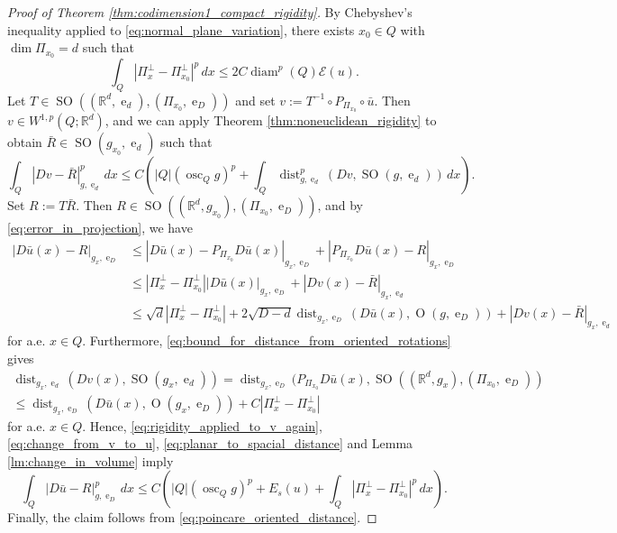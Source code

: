 \documentclass[10pt,a4paper]{amsart}
\DeclareMathOperator{\Ort}{O}
\DeclareMathOperator{\SO}{SO}
\DeclareMathOperator{\diam}{diam}
\DeclareMathOperator{\dist}{dist}
\DeclareMathOperator{\e}{e}
\DeclareMathOperator*{\osc}{osc}
\begin{document}
\begin{proof}[Proof of Theorem \ref{thm:codimension1_compact_rigidity}]
    By Chebyshev's inequality applied to \eqref{eq:normal_plane_variation}, there exists $x_0 \in Q$ with $\dim \Pi_{x_0} = d$ such that
    \begin{equation} \label{eq:poincare_oriented_distance}
        \int_Q |\Pi_x^\perp - \Pi_{x_0}^\perp|^p \, dx \le 2C \diam^p(Q) \mathcal{E}(u).
    \end{equation}
    Let $T \in \SO((\mathbb{R}^d, \e_d), (\Pi_{x_0}, \e_D))$ and set $v := T^{-1} \circ P_{\Pi_{x_0}} \circ \bar{u}$. Then $v \in W^{1, p}(Q; \mathbb{R}^d)$, and we can apply Theorem \ref{thm:noneuclidean_rigidity} to obtain $\bar{R} \in \SO(g_{x_0}, \e_d)$ such that
    \begin{equation} \label{eq:rigidity_applied_to_v_again}
        \int_Q |Dv - \bar{R}|_{g, \e_d}^p \, dx \le C \left(|Q| \left(\osc_Q g\right)^p + \int_Q \dist_{g, \e_d}^p(Dv, \SO(g, \e_d)) \, dx\right).
    \end{equation}
    Set $R := T\bar{R}$. Then $R \in \SO((\mathbb{R}^d, g_{x_0}), (\Pi_{x_0}, \e_D))$, and by \eqref{eq:error_in_projection}, we have
    \begin{equation} \label{eq:change_from_v_to_u}
        \begin{aligned}
            |D\bar{u}(x) - R|_{g_x, \e_D} &\le |D\bar{u}(x) - P_{\Pi_{x_0}} D\bar{u}(x)|_{g_x, \e_D} + |P_{\Pi_{x_0}} D\bar{u}(x) - R|_{g_x, \e_D} \\
            &\le |\Pi_x^\perp - \Pi_{x_0}^\perp| |D\bar{u}(x)|_{g_x, \e_D} + |Dv(x) - \bar{R}|_{g_x, \e_d} \\
            &\le \sqrt{d} |\Pi_x^\perp - \Pi_{x_0}^\perp| + 2\sqrt{D - d} \dist_{g_x, \e_D}(D\bar{u}(x), \Ort(g, \e_D)) + |Dv(x) - \bar{R}|_{g_x, \e_d}
        \end{aligned}
    \end{equation}
    for a.e. $x \in Q$. Furthermore, \eqref{eq:bound_for_distance_from_oriented_rotations} gives
    \begin{multline} \label{eq:planar_to_spacial_distance}
        \dist_{g_x, \e_d}(Dv(x), \SO(g_x, \e_d)) = \dist_{g_x, \e_D}(P_{\Pi_{x_0}} D\bar{u}(x), \SO((\mathbb{R}^d, g_x), (\Pi_{x_0}, \e_D)) \\
        \le \dist_{g_x, \e_D}(D\bar{u}(x), \Ort(g_x, \e_D)) + C|\Pi_x^\perp - \Pi_{x_0}^\perp|
    \end{multline}
    for a.e. $x \in Q$. Hence, \eqref{eq:rigidity_applied_to_v_again}, \eqref{eq:change_from_v_to_u}, \eqref{eq:planar_to_spacial_distance} and Lemma \ref{lm:change_in_volume} imply
    \[
    \int_Q |D\bar{u} - R|_{g, \e_D}^p \, dx \le C \left(|Q| \left(\osc_Q g\right)^p + E_s(u) + \int_Q |\Pi_x^\perp - \Pi_{x_0}^\perp|^p \, dx\right).
    \]
    Finally, the claim follows from \eqref{eq:poincare_oriented_distance}.
\end{proof}
\end{document}
